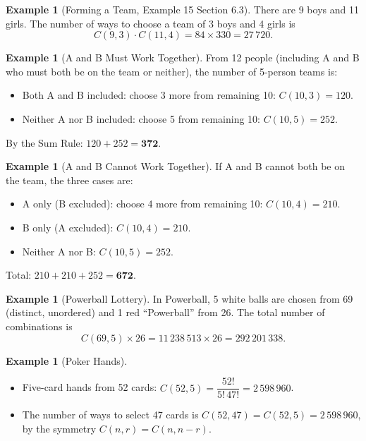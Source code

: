 \documentclass[11pt, a4paper, notitlepage]{report}
\theoremstyle{definition}
\newtheorem{example}[theorem]{Example}
\theoremstyle{remark}
\begin{document}
\begin{example}[Forming a Team, Example 15 Section 6.3]
There are 9 boys and 11 girls. The number of ways to choose a team of 3 boys and 4 girls is
\[
  C(9,3) \cdot C(11,4) = 84 \times 330 = 27\,720.
\]
\end{example}

\begin{example}[A and B Must Work Together]
From 12 people (including A and B who must both be on the team or neither), the number of
5-person teams is:
\begin{itemize}
  \item Both A and B included: choose 3 more from remaining 10: $C(10,3) = 120$.
  \item Neither A nor B included: choose 5 from remaining 10: $C(10,5) = 252$.
\end{itemize}
By the Sum Rule: $120 + 252 = \mathbf{372}$.
\end{example}

\begin{example}[A and B Cannot Work Together]
If A and B cannot both be on the team, the three cases are:
\begin{itemize}
  \item A only (B excluded): choose 4 more from remaining 10: $C(10,4) = 210$.
  \item B only (A excluded): $C(10,4) = 210$.
  \item Neither A nor B: $C(10,5) = 252$.
\end{itemize}
Total: $210 + 210 + 252 = \mathbf{672}$.
\end{example}

\begin{example}[Powerball Lottery]
In Powerball, 5 white balls are chosen from 69 (distinct, unordered) and 1 red ``Powerball''
from 26. The total number of combinations is
\[
  C(69, 5) \times 26 = 11\,238\,513 \times 26 = 292\,201\,338.
\]
\end{example}

\begin{example}[Poker Hands]
\begin{itemize}
  \item[(i)] Five-card hands from 52 cards: $C(52,5) = \dfrac{52!}{5!\,47!} = 2\,598\,960$.
  \item[(ii)] The number of ways to select 47 cards is $C(52,47) = C(52,5) = 2\,598\,960$,
              by the symmetry $C(n,r) = C(n,n-r)$.
\end{itemize}
\end{example}
\end{document}
